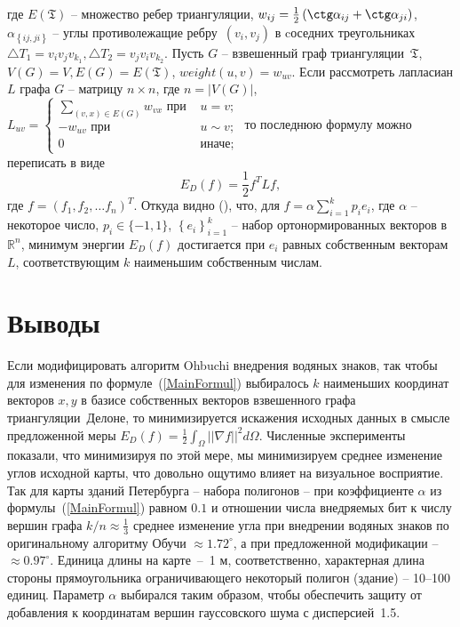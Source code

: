 \documentclass{article}
\begin{document}
где $E(\mathfrak{T})$ -- множество ребер триангуляции, $w_{ij} = \frac{1}{2}\left(\ctg\alpha_{ij} + \ctg\alpha_{ji}\right)$, $\alpha_{\left\{{ij, ji}\right\}}$ -- углы противолежащие 
ребру~$(v_i, v_j)$ в cоседних треугольниках $\triangle T_1 = v_i v_j v_{k_1}, \triangle T_2 = v_j v_i v_{k_2}$.
Пусть $G$ -- взвешенный граф триангуляции~$\mathfrak{T}$, $V(G) = V, E(G) = E(\mathfrak{T})$, $weight(u, v) = w_{uv}$. Если рассмотреть лапласиан $L$ графа $G$ -- матрицу $n \times n$, 
где $n = |V(G)|$, $L_{uv} = \begin{cases}
  \sum_{(v, x) \in E(G)}{w_{vx}}\mbox{ при }&\text{$u = v;$} \\
  -w_{uv}\mbox{ при }&\text{$u \sim v;$} \\
  0 &\text{иначе;}
    \end{cases}$ то последнюю формулу можно переписать в виде 
\begin{equation*}
  E_D(f) = \frac{1}{2} f^T L f, 
\end{equation*}
где $f = (f_1, f_2, \dots f_n)^T$. Откуда видно (\cite{Ross}), что, для $f = \alpha \sum_{i=1}^k p_i e_i$, где $\alpha$ -- некоторое число, $p_i \in \{-1, 1 \}$, 
$\left\{e_i\right\}_{i=1}^k$ -- набор ортонормированных векторов в $\mathbb{R}^n$, минимум энергии $E_D(f)$ достигается при $e_i$ равных собственным векторам 
$L$, соответствующим $k$ наименьшим собственным числам.  

\section{Выводы}
Если модифицировать алгоритм Ohbuchi внедрения водяных знаков, так чтобы для изменения по формуле~(\ref{MainFormul}) выбиралось $k$ наименьших координат векторов $x, y$ 
в базисе собственных векторов взвешенного графа триангуляции~Делоне, то минимизируется искажения исходных данных в смысле предложенной меры 
$E_D(f) = \frac{1}{2} \int_{\Omega}{||\nabla f||^2} d\Omega$. Численные эксперименты показали, что минимизируя по этой мере, мы минимизируем среднее изменение углов исходной карты, 
что довольно ощутимо влияет на визуальное восприятие.
Так для карты зданий Петербурга -- набора полигонов -- при коэффициенте $\alpha$ из формулы~(\ref{MainFormul}) равном $0.1$ и отношении числа внедряемых бит к числу вершин графа 
$k / n \approx \frac{1}{3}$ среднее изменение угла при внедрении водяных знаков по оригинальному алгоритму Обучи $\approx 1.72^\circ$, а при предложенной модификации -- 
$\approx 0.97^\circ$. Единица длины на карте~--~1 м, соответственно, характерная длина стороны прямоугольника ограничивающего некоторый полигон (здание) -- 10--100 единиц.
Параметр $\alpha$ выбирался таким образом, чтобы обеспечить защиту от добавления к координатам вершин гауссовского шума с дисперсией~1.5. 
 

\end{document}
